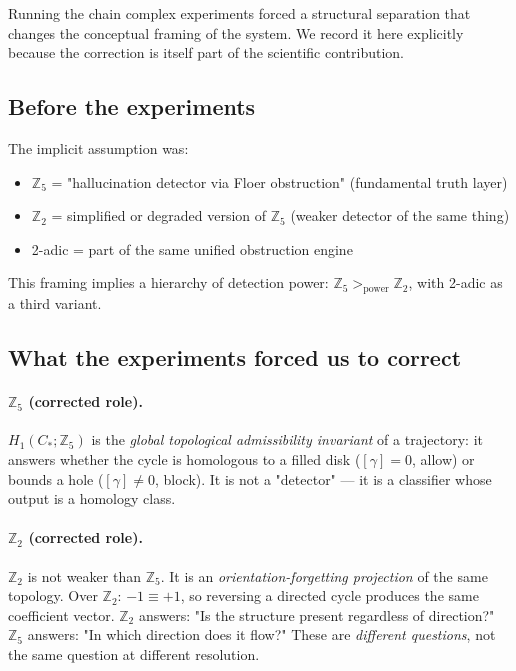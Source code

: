 \documentclass[11pt,a4paper]{article}
\begin{document}
Running the chain complex experiments forced a structural separation
that changes the conceptual framing of the system.
We record it here explicitly because the correction is itself part of
the scientific contribution.

\subsection*{Before the experiments}

The implicit assumption was:
\begin{itemize}
  \item $\mathbb{Z}_5$ = "hallucination detector via Floer obstruction"
        (fundamental truth layer)
  \item $\mathbb{Z}_2$ = simplified or degraded version of $\mathbb{Z}_5$
        (weaker detector of the same thing)
  \item 2-adic = part of the same unified obstruction engine
\end{itemize}
This framing implies a hierarchy of detection power:
$\mathbb{Z}_5 >_{\text{power}} \mathbb{Z}_2$,
with 2-adic as a third variant.

\subsection*{What the experiments forced us to correct}

\paragraph{$\mathbb{Z}_5$ (corrected role).}
$H_1(C_*;\mathbb{Z}_5)$ is the \emph{global topological admissibility
invariant} of a trajectory: it answers whether the cycle is homologous
to a filled disk ($[\gamma]=0$, allow) or bounds a hole
($[\gamma]\neq 0$, block).
It is not a "detector" --- it is a classifier whose output is
a homology class.

\paragraph{$\mathbb{Z}_2$ (corrected role).}
$\mathbb{Z}_2$ is not weaker than $\mathbb{Z}_5$.
It is an \emph{orientation-forgetting projection} of the same topology.
Over $\mathbb{Z}_2$: $-1 \equiv +1$, so reversing a directed cycle
produces the same coefficient vector.
$\mathbb{Z}_2$ answers: "Is the structure present regardless of direction?"
$\mathbb{Z}_5$ answers: "In which direction does it flow?"
These are \emph{different questions}, not the same question at different resolution.
\end{document}

